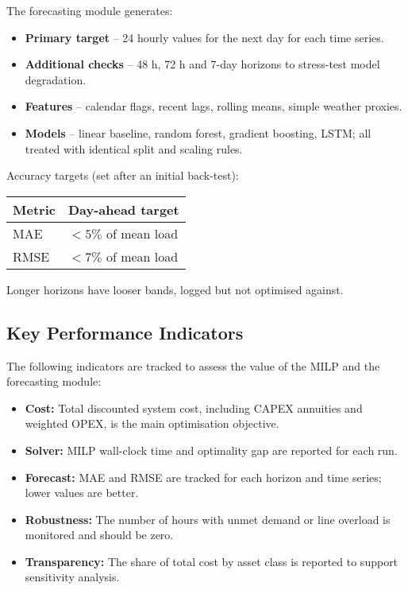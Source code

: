 The forecasting module generates:
\begin{itemize}
    \item \textbf{Primary target} -- 24 hourly values for the next day for each time series.
    \item \textbf{Additional checks} -- 48 h, 72 h and 7-day horizons to stress-test model degradation.
    \item \textbf{Features} -- calendar flags, recent lags, rolling means, simple weather proxies.
    \item \textbf{Models} -- linear baseline, random forest, gradient boosting, LSTM; all treated with identical split and scaling rules.
\end{itemize}

Accuracy targets (set after an initial back-test):

\begin{center}
\begin{tabular}{ll}
\textbf{Metric} & \textbf{Day-ahead target} \\
\hline
MAE & $< 5\%$ of mean load \\
RMSE & $< 7\%$ of mean load \\
\end{tabular}
\end{center}

Longer horizons have looser bands, logged but not optimised against.

\subsection{Key Performance Indicators}

The following indicators are tracked to assess the value of the MILP and the forecasting module:
\begin{itemize}
    \item \textbf{Cost:} Total discounted system cost, including CAPEX annuities and weighted OPEX, is the main optimisation objective.
    \item \textbf{Solver:} MILP wall-clock time and optimality gap are reported for each run.
    \item \textbf{Forecast:} MAE and RMSE are tracked for each horizon and time series; lower values are better.
    \item \textbf{Robustness:} The number of hours with unmet demand or line overload is monitored and should be zero.
    \item \textbf{Transparency:} The share of total cost by asset class is reported to support sensitivity analysis.
\end{itemize}

